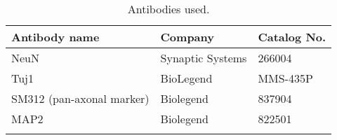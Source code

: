 \clearpage
\begin{longtable}{p{6cm} p{5cm} p{6cm}}
    \caption{Antibodies used.}
    \hline
    \textbf{Antibody name}                & \textbf{Company}      & \textbf{Catalog No.} \\
    \hline
    \hline
    NeuN                                  & Synaptic Systems      & 266004               \\
    \hline
    Tuj1                                  & BioLegend             & MMS-435P             \\
    \hline
    SM312 (pan-axonal marker)             & Biolegend             & 837904               \\
    \hline
    MAP2                                  & Biolegend             & 822501               \\
    \hline
    \label{tab:antibodies_used}
\end{longtable}

    
    